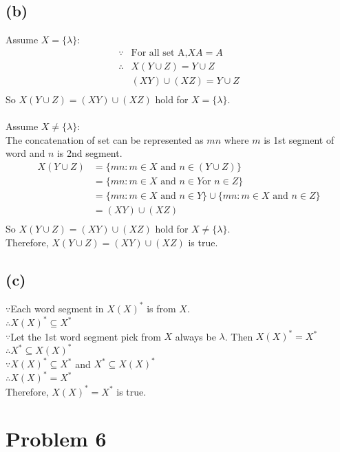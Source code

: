 \documentclass{article} %
\begin{document}
\subsection*{(b)}
Assume $X= \{\lambda \}$:\\
\[\begin{array}{rlcr}
\because& \mbox{For all set A,} XA=A\\
\therefore& X(Y \cup Z)=Y\cup Z\\
&(XY)\cup (XZ)=Y\cup Z\\
\end{array}\]
So $X(Y\cup Z)=(XY)\cup (XZ)$ hold for $X= \{\lambda \}$.\\
\\
Assume $X\neq \{\lambda \}$:\\

The concatenation of set can be represented as $mn$ where $m$ is 1st segment of word and $n$ is 2nd segment.\\
\[\begin{array}{rlcr}
X(Y\cup Z)&=\{mn:m\in X \mbox{ and } n\in (Y\cup Z)\}\\
&=\{mn:m\in X \mbox{ and } n\in Y  \mbox {or } n\in Z\}\\
&=\{mn:m\in X \mbox{ and } n\in Y\}\cup\{mn:m\in X \mbox{ and } n\in Z\}\\
&=(XY)\cup (XZ)\\
\end{array}\]
So $X(Y\cup Z)=(XY)\cup (XZ)$ hold for $X \neq \{\lambda \}$.\\
Therefore, $X(Y\cup Z)=(XY)\cup (XZ)$ is true.\\
\subsection*{(c)}
$\because$Each word segment in $X(X)^{*}$ is from $X$.\\
$\therefore X(X)^{*}\subseteq X^{*}$\\
$\because$Let the 1st word segment pick from $X$ always be $\lambda$. Then $X(X)^{*}=X^{*}$\\
$\therefore X^{*}\subseteq X(X)^{*}$\\
$\because X(X)^{*}\subseteq X^{*}$ and $X^{*}\subseteq X(X)^{*}$\\
$\therefore X(X)^{*}=X^{*}$\\
Therefore, $X(X)^{*}=X^{*}$ is true.\\
\section*{Problem 6}
\end{document}
